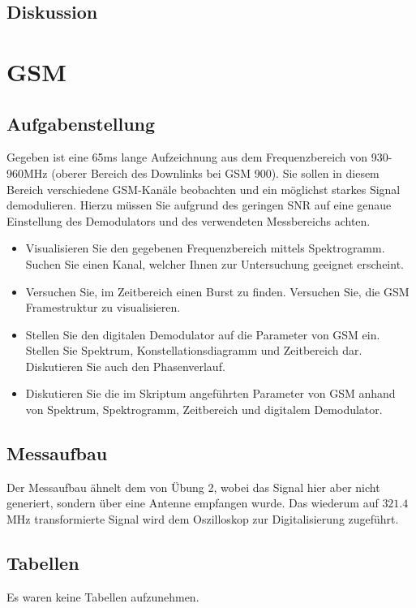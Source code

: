 \documentclass[12pt,a4paper,ngerman]{article}
\begin{document}
\subsection{Diskussion}



\pagebreak



\section{GSM}
\subsection{Aufgabenstellung}
Gegeben ist eine 65ms lange Aufzeichnung aus dem Frequenzbereich von 930-960MHz (oberer Bereich des Downlinks bei GSM 900). Sie sollen in diesem Bereich verschiedene GSM-Kanäle beobachten und ein möglichst starkes Signal demodulieren. Hierzu müssen Sie aufgrund des geringen SNR auf eine genaue Einstellung des Demodulators und des verwendeten Messbereichs achten. 
\begin{itemize}
\item Visualisieren Sie den gegebenen Frequenzbereich mittels Spektrogramm. Suchen Sie einen Kanal, welcher Ihnen zur Untersuchung geeignet erscheint.
\item Versuchen Sie, im Zeitbereich einen Burst zu finden. Versuchen Sie, die GSM Framestruktur zu visualisieren.
\item Stellen Sie den digitalen Demodulator auf die Parameter von GSM ein. Stellen Sie Spektrum, Konstellationsdiagramm und Zeitbereich dar. Diskutieren Sie auch den Phasenverlauf. 
\item Diskutieren Sie die im Skriptum angeführten Parameter von GSM anhand von Spektrum, Spektrogramm, Zeitbereich und digitalem Demodulator. 
\end{itemize}

\subsection{Messaufbau}
Der Messaufbau ähnelt dem von Übung 2, wobei das Signal hier aber nicht generiert, sondern über eine Antenne empfangen wurde. Das wiederum auf $321.4$MHz transformierte Signal wird dem Oszilloskop zur Digitalisierung zugeführt. 
\subsection{Tabellen}
Es waren keine Tabellen aufzunehmen. 
\end{document}
